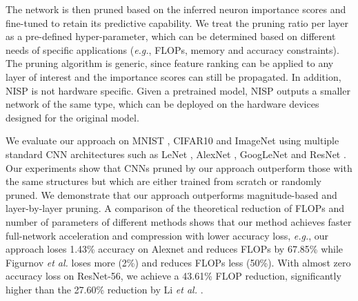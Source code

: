 \documentclass[10pt,twocolumn,letterpaper]{article}
\def\etal{\emph{et al.} }
\def\eg{\emph{e.g.}}
\begin{document}
The network is then pruned based on the inferred neuron
importance scores and fine-tuned to retain its predictive capability.
We treat the pruning ratio per layer as a pre-defined hyper-parameter, which can be determined based on different needs of specific applications (\eg, FLOPs, memory and accuracy constraints). The pruning algorithm is generic, since feature ranking can be applied to any layer of interest and the importance scores can still be propagated. In addition, NISP is not hardware specific. Given a pretrained model, NISP outputs a smaller network of the same type, which can be deployed on the hardware devices designed for the original model.

We evaluate our approach on MNIST \cite{lenet}, CIFAR10 \cite{CIFAR10} and ImageNet \cite{imagenet_cvpr09} using multiple standard CNN architectures such as LeNet \cite{lenet}, AlexNet \cite{Alexnet}, GoogLeNet \cite{googlenet} and ResNet \cite{resnet}. 
Our experiments show that CNNs pruned by our approach outperform those with the same structures but which are either trained from scratch or randomly pruned. We demonstrate that our approach outperforms magnitude-based and layer-by-layer pruning. 
A comparison of the theoretical reduction of FLOPs and number of parameters of different methods shows that our method achieves faster full-network acceleration and compression with lower accuracy loss, \eg, our approach loses 1.43\% accuracy on Alexnet and reduces FLOPs by 67.85\% while Figurnov \etal\cite{PerforatedCNN} loses more (2\%) and reduces FLOPs less (50\%).  With almost zero accuracy loss on ResNet-56, we achieve a 43.61\% FLOP reduction, significantly higher than the 27.60\% reduction by Li \etal\cite{pruneweigth}.

\end{document}
